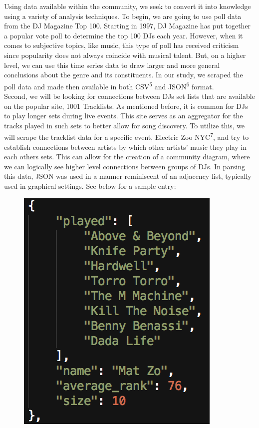 \documentclass[12pt]{dalcsthesis}
\begin{document}
Using data available within the community, we seek to convert it into knowledge using a variety of analysis techniques. To begin, we are going to use poll data from the DJ Magazine Top 100. Starting in 1997, DJ Magazine has put together a popular vote poll to determine the top 100 DJs each year. However, when it comes to subjective topics, like music, this type of poll has received criticism since popularity does not always coincide with musical talent. But, on a higher level, we can use this time series data to draw larger and more general conclusions about the genre and its constituents. In our study, we scraped the poll data and made then available in both CSV\textsuperscript{5} and JSON\textsuperscript{6} format. \\

Second, we will be looking for connections between DJs set lists that are available on the popular site, 1001 Tracklists. As mentioned before, it is common for DJs to play longer sets during live events. This site serves as an aggregator for the tracks played in such sets to better allow for song discovery. To utilize this, we will scrape the tracklist data for a specific event, Electric Zoo NYC\textsuperscript{7}, and try to establish connections between artists by which other artists' music they play in each others sets. This can allow for the creation of a community diagram, where we can logically see higher level connections between groups of DJs. In parsing this data, JSON was used in a manner reminiscent of an adjacency list, typically used in graphical settings. See below for a sample entry:\\

\begin{figure}[h]
\includegraphics[scale=.65]{ezoo_json}
\centering
\end{figure}
\end{document}
